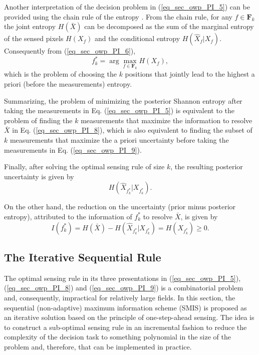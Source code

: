 Another interpretation of the decision problem in (\ref{eq_sec_owp_PI_5}) can be provided using the chain rule of the entropy \citep{cover_2006}. From the chain rule, for any $f\in \mathbf{F}_k$ the joint entropy $H(\bar{X})$ can be decomposed as the sum of  the marginal entropy of the sensed pixels $H({X}_f)$ and the conditional entropy $H(\hat{X}_f| {X}_f)$.  Consequently from (\ref{eq_sec_owp_PI_6}),
\begin{equation}\label{eq_sec_owp_PI_9}
	f^*_k = \arg \max_{f\in \mathbf{F}_k} 	H({X}_f), 
\end{equation}
which is the problem of choosing the $k$ positions that jointly lead to the highest a priori (before the measurements) entropy.

\begin{remark}
Summarizing, the  problem of minimizing the posterior Shannon entropy after taking the measurements in Eq. (\ref{eq_sec_owp_PI_5}) is equivalent to the problem of finding the $k$ measurements that maximize the information to resolve $\bar{X}$ in Eq. (\ref{eq_sec_owp_PI_8}),  which is also equivalent to finding the subset of $k$ measurements that maximize the a priori uncertainty before taking the measurements in Eq. (\ref{eq_sec_owp_PI_9}).
\end{remark}

Finally, after solving the optimal sensing rule of size $k$,  the resulting posterior uncertainty is given by
\begin{equation}\label{eq_sec_owp_PI_10}
	H(\hat{X}_{f^*_k}| {X}_{f^*_k}).
\end{equation}

On the other hand, the reduction on the uncertainty (prior minus posterior entropy), attributed to the information of $f^*_k$ to resolve $\bar{X}$, is given by
\begin{equation}\label{eq_sec_owp_PI_11}
	I(f^*_k) = H(\bar{X}) - H(\hat{X}_{f^*_k}| {X}_{f^*_k}) = H({X}_{f^*_k}) \geq 0. 
\end{equation}
 
\subsection{The Iterative Sequential Rule}
\label{sec_numerical_OWP_PI}
The optimal sensing rule in its three presentations in (\ref{eq_sec_owp_PI_5}), (\ref{eq_sec_owp_PI_8}) and (\ref{eq_sec_owp_PI_9}) is a combinatorial problem and, consequently, impractical for relatively large fields. In this section, the sequential (non-adaptive) maximum information scheme (SMIS) is proposed as an iterative solution based on the principle of one-step-ahead sensing. The idea is to construct a sub-optimal sensing rule in an incremental fashion to reduce the complexity of the decision task to something polynomial in the size of the problem and, therefore, that can be implemented in practice.

